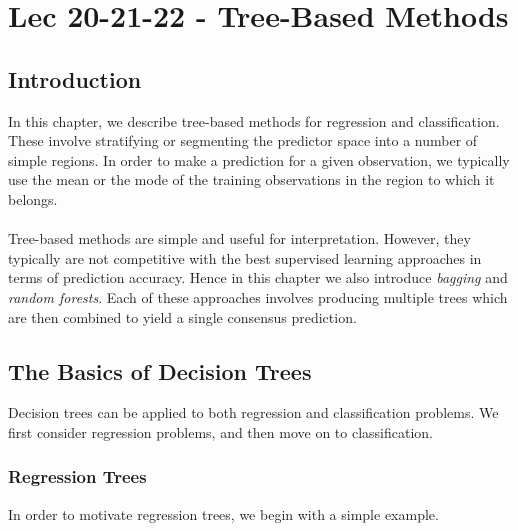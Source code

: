 \chapter{Lec 20-21-22 - Tree-Based Methods}

\section{Introduction}
In this chapter, we describe tree-based methods for regression and classification. These involve stratifying or segmenting the predictor space into a number of simple regions. In order to make a prediction for a given observation, we typically use the mean or the mode of the training observations in the region to which it belongs.\\\\
Tree-based methods are simple and useful for interpretation. However,
they typically are not competitive with the best supervised learning approaches in terms of prediction accuracy. Hence in this chapter we also introduce \textit{bagging} and \textit{random forests}. Each of these approaches involves producing multiple trees which are then combined to yield a single consensus prediction.

\section{The Basics of Decision Trees}
Decision trees can be applied to both regression and classification problems.
We first consider regression problems, and then move on to classification.

\subsection{Regression Trees}
In order to motivate regression trees, we begin with a simple example.

